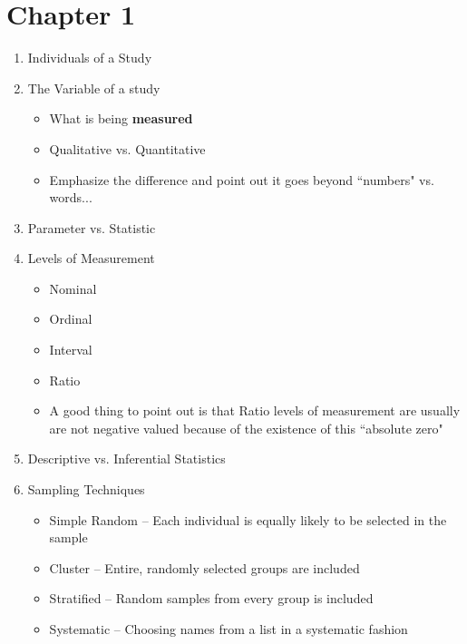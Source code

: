 \documentclass{article}
\begin{document}
\section*{Chapter 1}

\begin{enumerate}

    \item Individuals of a Study
    
    \item The Variable of a study
        \begin{itemize}
        \item What is being \textbf{measured}
        \item Qualitative vs. Quantitative
        \item Emphasize the difference and point out it goes beyond ``numbers" vs. words...
        \end{itemize}
        
    \item Parameter vs. Statistic
    
    \item Levels of Measurement
    
        \begin{itemize}
        
            \item Nominal
            \item Ordinal
            \item Interval
            \item Ratio
            \item A good thing to point out is that Ratio levels of measurement are usually are not negative valued because of the existence of this ``absolute zero"
            
        \end{itemize}
        
    \item Descriptive vs. Inferential Statistics
    
    \item Sampling Techniques
    
        \begin{itemize}
        \item Simple Random -- Each individual is equally likely to be selected in the sample
        \item Cluster -- Entire, randomly selected groups are included
        \item Stratified -- Random samples from every group is included
        \item Systematic -- Choosing names from a list in a systematic fashion
        \end{itemize}
        

\end{enumerate}
\end{document}
